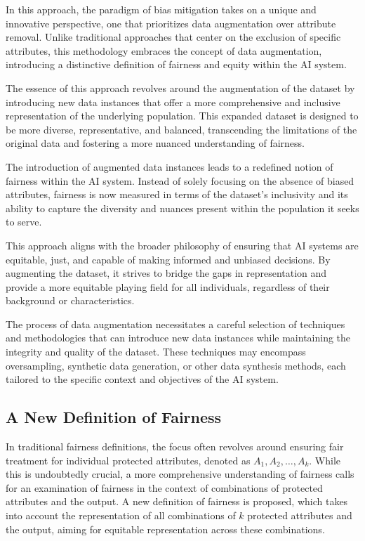 \documentclass[12pt,a4paper,openright,twoside]{book}
\begin{document}
In this approach, the paradigm of bias mitigation takes on a unique and innovative perspective, one that prioritizes data augmentation over attribute removal. Unlike traditional approaches that center on the exclusion of specific attributes, this methodology embraces the concept of data augmentation, introducing a distinctive definition of fairness and equity within the AI system.

The essence of this approach revolves around the augmentation of the dataset by introducing new data instances that offer a more comprehensive and inclusive representation of the underlying population. This expanded dataset is designed to be more diverse, representative, and balanced, transcending the limitations of the original data and fostering a more nuanced understanding of fairness. 

The introduction of augmented data instances leads to a redefined notion of fairness within the AI system. Instead of solely focusing on the absence of biased attributes, fairness is now measured in terms of the dataset's inclusivity and its ability to capture the diversity and nuances present within the population it seeks to serve. 

This approach aligns with the broader philosophy of ensuring that AI systems are equitable, just, and capable of making informed and unbiased decisions. By augmenting the dataset, it strives to bridge the gaps in representation and provide a more equitable playing field for all individuals, regardless of their background or characteristics. 

The process of data augmentation necessitates a careful selection of techniques and methodologies that can introduce new data instances while maintaining the integrity and quality of the dataset. These techniques may encompass oversampling, synthetic data generation, or other data synthesis methods, each tailored to the specific context and objectives of the AI system.

\subsection{A New Definition of Fairness}

In traditional fairness definitions, the focus often revolves around ensuring fair treatment for individual protected attributes, denoted as $A_1, A_2, \ldots, A_k$. While this is undoubtedly crucial, a more comprehensive understanding of fairness calls for an examination of fairness in the context of combinations of protected attributes and the output. A new definition of fairness is proposed, which takes into account the representation of all combinations of $k$ protected attributes and the output, aiming for equitable representation across these combinations.
\end{document}
